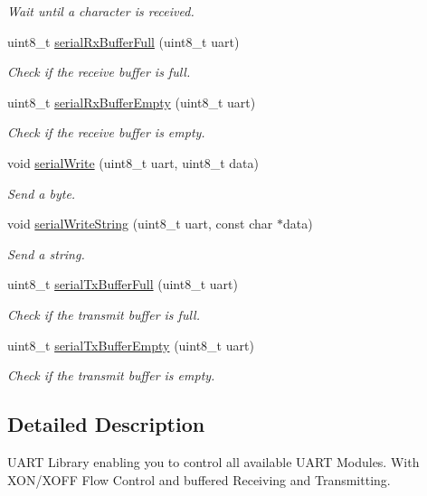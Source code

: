 \begin{DoxyCompactItemize}
\begin{DoxyCompactList}\small\item\em Wait until a character is received. \end{DoxyCompactList}\item 
uint8\-\_\-t \hyperlink{group__uart_ga73d16b244172336e7306ea2e4cf90fa1}{serial\-Rx\-Buffer\-Full} (uint8\-\_\-t uart)
\begin{DoxyCompactList}\small\item\em Check if the receive buffer is full. \end{DoxyCompactList}\item 
uint8\-\_\-t \hyperlink{group__uart_ga742268372398b85935564fded999b198}{serial\-Rx\-Buffer\-Empty} (uint8\-\_\-t uart)
\begin{DoxyCompactList}\small\item\em Check if the receive buffer is empty. \end{DoxyCompactList}\item 
void \hyperlink{group__uart_ga388583adaa7db4fad121b6454668b347}{serial\-Write} (uint8\-\_\-t uart, uint8\-\_\-t data)
\begin{DoxyCompactList}\small\item\em Send a byte. \end{DoxyCompactList}\item 
void \hyperlink{group__uart_ga054d68834f9ca19f3b2cf9d714337de4}{serial\-Write\-String} (uint8\-\_\-t uart, const char $\ast$data)
\begin{DoxyCompactList}\small\item\em Send a string. \end{DoxyCompactList}\item 
uint8\-\_\-t \hyperlink{group__uart_ga8a6adfd3c350ceb55605d003a62a36a4}{serial\-Tx\-Buffer\-Full} (uint8\-\_\-t uart)
\begin{DoxyCompactList}\small\item\em Check if the transmit buffer is full. \end{DoxyCompactList}\item 
uint8\-\_\-t \hyperlink{group__uart_ga14c345ea0707111e988a80ef1da65e32}{serial\-Tx\-Buffer\-Empty} (uint8\-\_\-t uart)
\begin{DoxyCompactList}\small\item\em Check if the transmit buffer is empty. \end{DoxyCompactList}\end{DoxyCompactItemize}


\subsection{Detailed Description}
U\-A\-R\-T Library enabling you to control all available U\-A\-R\-T Modules. With X\-O\-N/\-X\-O\-F\-F Flow Control and buffered Receiving and Transmitting. 

